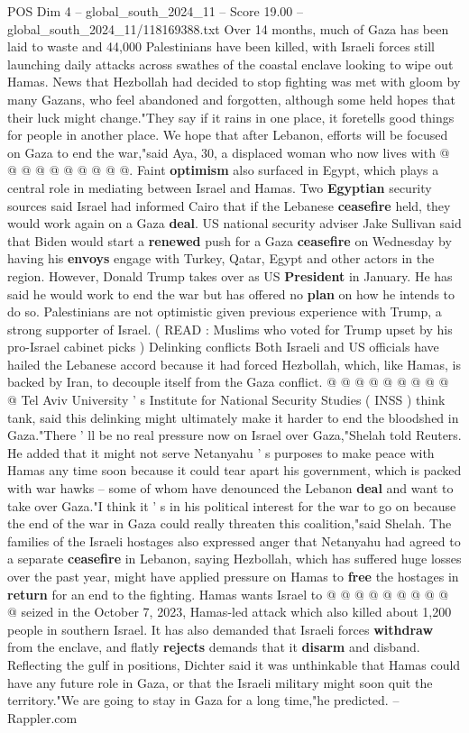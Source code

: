 \begin{textsample}{POS Dim 4 – global\_south\_2024\_11 – Score 19.00 – global\_south\_2024\_11/118169388.txt}
Over 14 months, much of Gaza has been laid to waste and 44,000 Palestinians have been killed, with Israeli forces still launching daily attacks across swathes of the coastal enclave looking to wipe out Hamas.
News that Hezbollah had decided to stop fighting was met with gloom by many Gazans, who feel abandoned and forgotten, although some held hopes that their luck might change."They say if it rains in one place, it foretells good things for people in another place.
We hope that after Lebanon, efforts will be focused on Gaza to end the war,"said Aya, 30, a displaced woman who now lives with @ @ @ @ @ @ @ @ @ @.
Faint \textbf{optimism} also surfaced in Egypt, which plays a central role in mediating between Israel and Hamas.
Two \textbf{Egyptian} security sources said Israel had informed Cairo that if the Lebanese \textbf{ceasefire} held, they would work again on a Gaza \textbf{deal}.
US national security adviser Jake Sullivan said that Biden would start a \textbf{renewed} push for a Gaza \textbf{ceasefire} on Wednesday by having his \textbf{envoys} engage with Turkey, Qatar, Egypt and other actors in the region.
However, Donald Trump takes over as US \textbf{President} in January.
He has said he would work to end the war but has offered no \textbf{plan} on how he intends to do so.
Palestinians are not optimistic given previous experience with Trump, a strong supporter of Israel. ( READ : Muslims who voted for Trump upset by his pro-Israel cabinet picks ) Delinking conflicts Both Israeli and US officials have hailed the Lebanese accord because it had forced Hezbollah, which, like Hamas, is backed by Iran, to decouple itself from the Gaza conflict. @ @ @ @ @ @ @ @ @ @ Tel Aviv University ' s Institute for National Security Studies ( INSS ) think tank, said this delinking might ultimately make it harder to end the bloodshed in Gaza."There ' ll be no real pressure now on Israel over Gaza,"Shelah told Reuters.
He added that it might not serve Netanyahu ' s purposes to make peace with Hamas any time soon because it could tear apart his government, which is packed with war hawks -- some of whom have denounced the Lebanon \textbf{deal} and want to take over Gaza."I think it ' s in his political interest for the war to go on because the end of the war in Gaza could really threaten this coalition,"said Shelah.
The families of the Israeli hostages also expressed anger that Netanyahu had agreed to a separate \textbf{ceasefire} in Lebanon, saying Hezbollah, which has suffered huge losses over the past year, might have applied pressure on Hamas to \textbf{free} the hostages in \textbf{return} for an end to the fighting.
Hamas wants Israel to @ @ @ @ @ @ @ @ @ @ seized in the October 7, 2023, Hamas-led attack which also killed about 1,200 people in southern Israel.
It has also demanded that Israeli forces \textbf{withdraw} from the enclave, and flatly \textbf{rejects} demands that it \textbf{disarm} and disband.
Reflecting the gulf in positions, Dichter said it was unthinkable that Hamas could have any future role in Gaza, or that the Israeli military might soon quit the territory."We are going to stay in Gaza for a long time,"he predicted. -- Rappler.com


\end{textsample}
